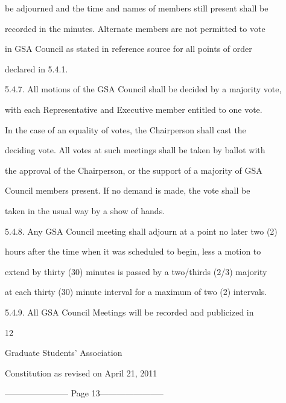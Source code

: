         be adjourned and the time and names of members still present shall be  

        recorded in the minutes.  Alternate members are not permitted to vote  

        in  GSA  Council  as  stated  in  reference  source  for  all  points  of  order  

        declared in 5.4.1.  



5.4.7. All motions of the  GSA  Council shall be decided by a majority vote,  

        with each Representative and Executive  member entitled to one vote.  

        In  the  case  of  an  equality  of  votes,  the  Chairperson  shall  cast  the  

        deciding vote. All votes at such meetings shall be taken by ballot with  

        the approval of the Chairperson, or the support of a majority of  GSA  

        Council  members  present.  If  no  demand  is  made,  the  vote  shall  be  

        taken in the usual way by a show of hands.  



5.4.8. Any  GSA  Council  meeting  shall  adjourn  at  a  point  no  later  two  (2)  

        hours after the time when it was scheduled to begin, less a motion to  

        extend by thirty (30) minutes is passed by a two/thirds (2/3) majority  

        at each thirty (30) minute interval for a maximum of two (2) intervals.  



5.4.9. All   GSA   Council   Meetings   will   be   recorded   and   publicized   in  



                                                 

                                              12  



                                Graduate Students’ Association  



                           Constitution as revised on April 21, 2011  


----------------------- Page 13-----------------------


